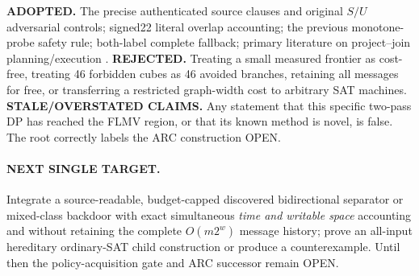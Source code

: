 \documentclass[10pt]{article}
\begin{document}
\textbf{ADOPTED.} The precise authenticated source clauses and original $S/U$ adversarial controls; signed22 literal overlap accounting; the previous monotone-probe safety rule; both-label complete fallback; primary literature on project--join planning/execution \cite{dpmc}. \textbf{REJECTED.} Treating a small measured frontier as cost-free, treating 46 forbidden cubes as 46 avoided branches, retaining all messages for free, or transferring a restricted graph-width cost to arbitrary SAT machines. \textbf{STALE/OVERSTATED CLAIMS.} Any statement that this specific two-pass DP has reached the FLMV region, or that its known method is novel, is false. The root correctly labels the ARC construction OPEN. 

\paragraph{NEXT SINGLE TARGET.} Integrate a source-readable, budget-capped discovered bidirectional separator or mixed-class backdoor with exact simultaneous \emph{time and writable space} accounting and without retaining the complete $O(m2^w)$ message history; prove an all-input hereditary ordinary-SAT child construction or produce a counterexample. Until then the policy-acquisition gate and ARC successor remain OPEN.


\end{document}
